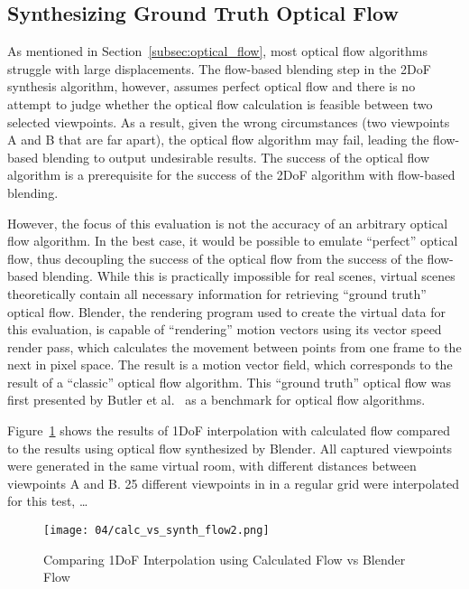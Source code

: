 \subsection{Synthesizing Ground Truth Optical Flow}
As mentioned in Section~\ref{subsec:optical_flow}, most optical flow algorithms struggle with large displacements. The flow-based blending step in the 2DoF synthesis algorithm, however, assumes perfect optical flow and there is no attempt to judge whether the optical flow calculation is feasible between two selected viewpoints. As a result, given the wrong circumstances (two viewpoints A and B that are far apart), the optical flow algorithm may fail, leading the flow-based blending to output undesirable results. The success of the optical flow algorithm is a prerequisite for the success of the 2DoF algorithm with flow-based blending.

However, the focus of this evaluation is not the accuracy of an arbitrary optical flow algorithm. In the best case, it would be possible to emulate ``perfect'' optical flow, thus decoupling the success of the optical flow from the success of the flow-based blending. While this is practically impossible for real scenes, virtual scenes theoretically contain all necessary information for retrieving ``ground truth'' optical flow. Blender, the rendering program used to create the virtual data for this evaluation, is capable of ``rendering'' motion vectors using its vector speed render pass, which calculates the movement between points from one frame to the next in pixel space. The result is a motion vector field, which corresponds to the result of a ``classic'' optical flow algorithm. This ``ground truth'' optical flow was first presented by Butler et al.\ \cite{sintel} as a benchmark for optical flow algorithms.

Figure~\ref{fig:calc_vs_synth_flow} shows the results of 1DoF interpolation with calculated flow compared to the results using optical flow synthesized by Blender. All captured viewpoints were generated in the same virtual room, with different distances between viewpoints A and B. 25 different viewpoints in in a regular grid were interpolated for this test, \ldots

\begin{figure}
		\centering
		\texttt{[image: 04/calc\_vs\_synth\_flow2.png]}
		\caption{Comparing 1DoF Interpolation using Calculated Flow vs Blender Flow}
		\label{fig:calc_vs_synth_flow}
\end{figure}

